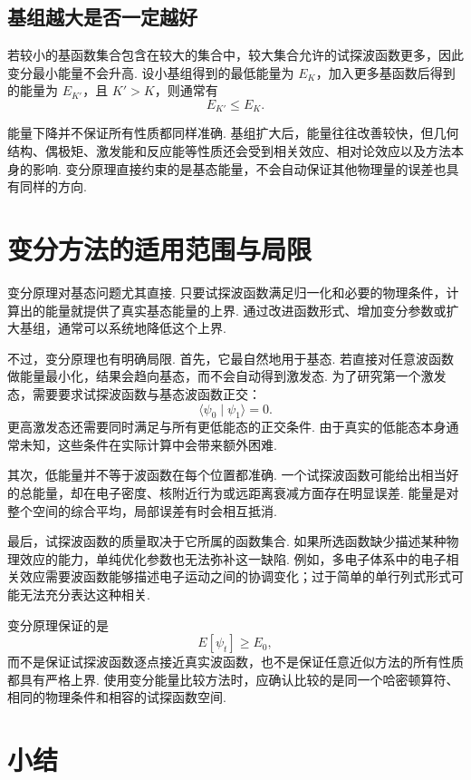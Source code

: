 \documentclass[UTF8,11pt,a4paper,openany]{ctexbook}
\newcommand{\braket}[2]{\langle #1\mid #2\rangle}\newcommand{\ii}{\mathrm i}
\begin{document}
\subsection{基组越大是否一定越好}

若较小的基函数集合包含在较大的集合中，较大集合允许的试探波函数更多，因此变分最小能量不会升高. 设小基组得到的最低能量为 $E_K$，加入更多基函数后得到的能量为 $E_{K'}$，且 $K'>K$，则通常有
\[
E_{K'}\leq E_K.
\]

\begin{limitbox}
能量下降并不保证所有性质都同样准确. 基组扩大后，能量往往改善较快，但几何结构、偶极矩、激发能和反应能等性质还会受到相关效应、相对论效应以及方法本身的影响. 变分原理直接约束的是基态能量，不会自动保证其他物理量的误差也具有同样的方向. 
\end{limitbox}

\section{变分方法的适用范围与局限}

变分原理对基态问题尤其直接. 只要试探波函数满足归一化和必要的物理条件，计算出的能量就提供了真实基态能量的上界. 通过改进函数形式、增加变分参数或扩大基组，通常可以系统地降低这个上界. 

不过，变分原理也有明确局限. 首先，它最自然地用于基态. 若直接对任意波函数做能量最小化，结果会趋向基态，而不会自动得到激发态. 为了研究第一个激发态，需要要求试探波函数与基态波函数正交：
\[
\braket{\psi_0}{\psi_1}=0.
\]
更高激发态还需要同时满足与所有更低能态的正交条件. 由于真实的低能态本身通常未知，这些条件在实际计算中会带来额外困难. 

其次，低能量并不等于波函数在每个位置都准确. 一个试探波函数可能给出相当好的总能量，却在电子密度、核附近行为或远距离衰减方面存在明显误差. 能量是对整个空间的综合平均，局部误差有时会相互抵消. 

最后，试探波函数的质量取决于它所属的函数集合. 如果所选函数缺少描述某种物理效应的能力，单纯优化参数也无法弥补这一缺陷. 例如，多电子体系中的电子相关效应需要波函数能够描述电子运动之间的协调变化；过于简单的单行列式形式可能无法充分表达这种相关. 

\begin{limitbox}
变分原理保证的是
\[
E[\psi_t]\geq E_0,
\]
而不是保证试探波函数逐点接近真实波函数，也不是保证任意近似方法的所有性质都具有严格上界. 使用变分能量比较方法时，应确认比较的是同一个哈密顿算符、相同的物理条件和相容的试探函数空间. 
\end{limitbox}

\section{小结}
\end{document}
